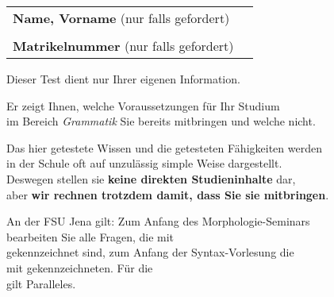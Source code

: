 \documentclass[12pt,a4paper,twoside]{article}
\begin{document}
\maketitle
\thispagestyle{empty}

\begin{tabular}[h]{lp{8cm}}
  \textbf{Name, Vorname} (nur falls gefordert) & \\\cline{2-2}
  &\\
  \textbf{Matrikelnummer} (nur falls gefordert) & \\\cline{2-2}
\end{tabular}

\vspace{2cm}

\begin{center}

  \Large{Dieser Test dient nur Ihrer eigenen Information.\\

    \Zeile

  Er zeigt Ihnen, welche Voraussetzungen für Ihr Studium\\
  im Bereich \textit{Grammatik} Sie bereits mitbringen und welche nicht.\\

  \Zeile

  Das hier getestete Wissen und die getesteten Fähigkeiten werden\\
  in der Schule oft auf unzulässig simple Weise dargestellt.\\
  Deswegen stellen sie \textbf{keine direkten Studieninhalte} dar,\\
  aber \textbf{wir rechnen trotzdem damit, dass Sie sie mitbringen}.\\
  
  \Zeile

  An der FSU Jena gilt: Zum Anfang des Morphologie-Seminars\\
  bearbeiten Sie alle Fragen, die mit \morphologieaufgabe[]\\
  gekennzeichnet sind, zum Anfang der Syntax-Vorlesung die\\
  mit \syntaxaufgabe[] gekennzeichneten. Für die\\
  \graphematikaufgabe[] gilt Paralleles.\\

  \Zeile

}
\end{center}

\newpage
\setcounter{page}{1}
\end{document}
